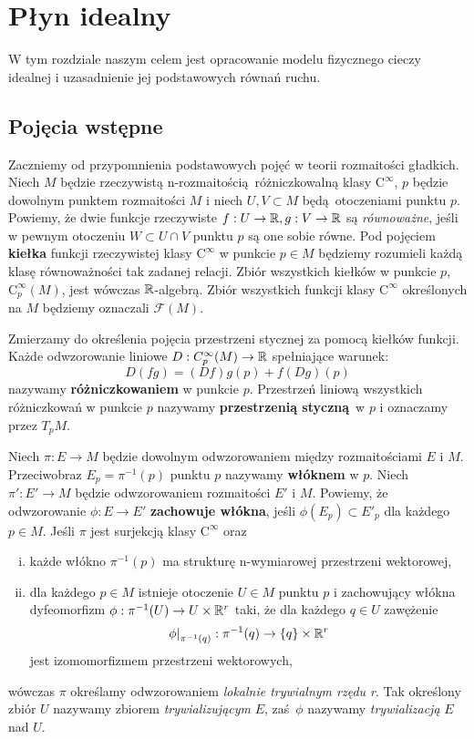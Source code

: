 \chapter{Płyn idealny} W tym rozdziale naszym celem jest opracowanie modelu fizycznego cieczy idealnej i uzasadnienie jej podstawowych równań ruchu.

\section{Pojęcia wstępne}
Zaczniemy od przypomnienia podstawowych pojęć w teorii rozmaitości gładkich. Niech \(M\) będzie rzeczywistą n-rozmaitością różniczkowalną klasy \(\mathrm{C}^\infty\), \(p\) będzie dowolnym punktem rozmaitości \(M\) i niech \(U, V\subset M\) będą otoczeniami punktu \(p\). Powiemy, że dwie funkcje rzeczywiste \(f:U\to\mathbb{R}, g:V\to\mathbb{R}\) są \emph{równoważne}, jeśli w pewnym otoczeniu \(W\subset U\cap V\) punktu \(p\) są one sobie równe. Pod pojęciem \textbf{kiełka} funkcji rzeczywistej klasy \(\mathrm{C}^\infty\) w punkcie \(p\in M\) będziemy rozumieli każdą klasę równoważności tak zadanej relacji. Zbiór wszystkich kiełków w punkcie \(p\), \(\mathrm{C}_p^\infty(M)\), jest wówczas \(\mathbb{R}\)-algebrą. Zbiór wszystkich funkcji klasy \(\mathrm{C}^\infty\) określonych na \(M\) będziemy oznaczali \(\mathcal{F}(M)\). 

Zmierzamy do określenia pojęcia przestrzeni stycznej za pomocą kiełków funkcji. Każde odwzorowanie liniowe \(D:C_p^\infty(M)\to\mathbb{R}\) spełniające warunek:
\begin{equation}\label{eq:differentiation}
D(fg) = (Df)g(p) + f(Dg)(p)
\end{equation}
nazywamy \textbf{różniczkowaniem} w punkcie \(p\). Przestrzeń liniową wszystkich różniczkowań w punkcie \(p\) nazywamy \textbf{przestrzenią styczną} w \(p\) i oznaczamy przez \(T_pM\).

Niech \(\pi: E\to M\) będzie dowolnym odwzorowaniem między rozmaitościami \(E\) i \(M\). Przeciwobraz \(E_p = \pi^{-1}(p)\) punktu \(p\) nazywamy \textbf{włóknem} w \(p\). Niech \(\pi': E'\to M\) będzie odwzorowaniem rozmaitości \(E'\) i \(M\). Powiemy, że odwzorowanie \(\phi:E\to E'\) \textbf{zachowuje włókna}, jeśli \(\phi(E_p)\subset E'_p\) dla każdego \(p\in M\). Jeśli \(\pi\) jest surjekcją klasy \(\mathrm{C}^\infty\) oraz
\begin{enumerate}[i)]
\item każde włókno \(\pi^{-1}(p)\) ma strukturę n-wymiarowej przestrzeni wektorowej,
\item dla każdego \(p\in M\) istnieje otoczenie \(U\in M\) punktu \(p\) i zachowujący włókna dyfeomorfizm \(\phi: \pi^{-1}(U)\to U\times \mathbb{R}^r\) taki, że dla każdego \(q\in U\) zawężenie
\begin{equation*}
\left.\phi\right|_{\pi^{-1}(q)}:\pi^{-1}(q)\to \{q\} \times \mathbb{R}^r
\end{equation*}
jest izomomorfizmem przestrzeni wektorowych,

\end{enumerate}
wówczas \(\pi\) określamy odwzorowaniem \emph{lokalnie trywialnym rzędu r}.  Tak określony zbiór \(U\) nazywamy zbiorem \emph{trywializującym} \(E\), zaś \(\phi\) nazywamy \emph{trywializacją} \(E\) nad \(U\).

